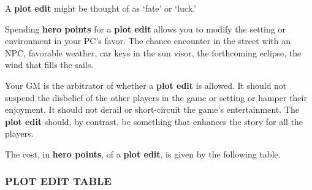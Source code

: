 \documentclass[
]{article}
\begin{document}
A \textbf{plot edit} might be thought of as `fate' or `luck.'

Spending \textbf{hero points} for a \textbf{plot edit} allows you to
modify the setting or environment in your PC's favor. The chance
encounter in the street with an NPC, favorable weather, car keys in the
sun visor, the forthcoming eclipse, the wind that fills the sails.

Your GM is the arbitrator of whether a \textbf{plot edit} is allowed. It
should not suspend the disbelief of the other players in the game or
setting or hamper their enjoyment. It should not derail or short-circuit
the game's entertainment. The \textbf{plot edit} should, by contrast, be
something that enhances the story for all the players.

The cost, in \textbf{hero points}, of a \textbf{plot edit}, is given by
the following table.

\hypertarget{plot-edit-table}{%
\subsubsection{PLOT EDIT TABLE}\label{plot-edit-table}}
\end{document}
